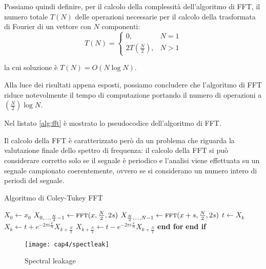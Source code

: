 Possiamo quindi definire, per il calcolo della complessità dell'algoritmo di FFT, il numero totale $T(N)$ delle operazioni necessarie per il calcolo della trasformata di Fourier di un vettore con $N$ componenti:
\begin{equation}
T(N)=
\left\{\begin{matrix}
 0, & N=1 \\ 
 2T \left ( \frac{N}{2} \right ), & N>1
\end{matrix}\right.
\end{equation}

la cui soluzione è $T(N)=O(N \log N )$.

Alla luce dei risultati appena esposti, possiamo concludere che l'algoritmo di FFT riduce notevolmente il tempo di computazione portando il numero di operazioni a $(\frac{N}{2}) \log N$.

Nel listato \ref{alg:fft} è mostrato lo pseudocodice dell'algoritmo di FFT.

Il calcolo della FFT è caratterizzato però da un problema che riguarda la valutazione finale dello spettro di frequenza: il calcolo della FFT si può considerare corretto solo se il segnale è periodico e l'analisi viene effettuata su un segnale campionato coerentemente, ovvero se si considerano un numero intero di periodi del segnale.

\begin{algorithm}
\caption{Algoritmo di Coley-Tukey FFT}\label{alg:fft}
\begin{algorithmic}[1]
\State $X_0 \gets x_0 $
\Else
\State $X_{0,...,\frac{N}{2}-1} \gets \textsc{fft}(x, \frac{N}{2}, 2s) $
\State $X_{\frac{N}{2},...,N-1} \gets \textsc{fft}(x+s, \frac{N}{2}, 2s) $
\State $t \gets X_k$
\State $ X_k \gets t + e^{-2 \pi i \frac{k}{N}} X_{k+\frac{N}{2}}$
\State $ X_{k+\frac{N}{2}} \gets t - e^{-2 \pi i \frac{k}{N}} X_{k+\frac{N}{2}}$
\EndFor
\State \textbf{end for}
\EndIf
\State \textbf{end if}
\EndProcedure
\end{algorithmic}
\end{algorithm}

\begin{figure}  
  \begin{center}
    \texttt{[image: cap4/spectleak]}
    \caption{Spectral leakage}
    \label{spectleak}
  \end{center}
\end{figure}

